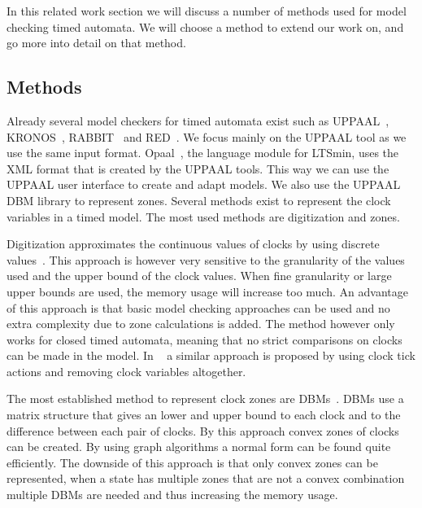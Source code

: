 In this related work section we will discuss a number of methods used for model checking timed automata. We will choose a method to extend our work on, and go more into detail on that method.

\subsection{Methods}
Already several model checkers for timed automata exist such as UPPAAL~\cite{UPPAAL}, KRONOS~\cite{kronos}, RABBIT~\cite{CAV03} and RED~\cite{crds}. We focus mainly on the UPPAAL tool as we use the same input format. Opaal~\cite{opaal}, the language module for LTSmin, uses the XML format that is created by the UPPAAL tools. This way we can use the UPPAAL user interface to create and adapt models. We also use the UPPAAL DBM library to represent zones. Several methods exist to represent the clock variables in a timed model. The most used methods are digitization and zones. 

Digitization approximates the continuous values of clocks by using discrete values~\cite{CHARME01}. This approach is however very sensitive to the granularity of the values used and the upper bound of the clock values. When fine granularity or large upper bounds are used, the memory usage will increase too much. An advantage of this approach is that basic model checking approaches can be used and no extra complexity due to zone calculations is added. The method however only works for closed timed automata, meaning that no strict comparisons on clocks can be made in the model. In ~\cite{nguyen2012discrete} a similar approach is proposed by using clock tick actions and removing clock variables altogether. 

The most established method to represent clock zones are DBMs~\cite{dbmorig, bengtsson2002clocks}. DBMs use a matrix structure that gives an lower and upper bound to each clock and to the difference between each pair of clocks. By this approach convex zones of clocks can be created. By using graph algorithms a normal form can be found quite efficiently. The downside of this approach is that only convex zones can be represented, when a state has multiple zones that are not a convex combination multiple DBMs are needed and thus increasing the memory usage. 

